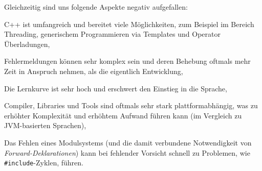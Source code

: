 Gleichzeitig sind uns folgende Aspekte negativ aufgefallen:
\begin{sitemize}{-0.3cm}
  \item C++ ist umfangreich und bereitet viele Möglichkeiten, zum Beispiel im
  Bereich Threading, generischem Programmieren via Templates und Operator
  Überladungen,
  \item Fehlermeldungen können sehr komplex sein und deren Behebung oftmals mehr
  Zeit in Anspruch nehmen, als die eigentlich Entwicklung,
  \item Die Lernkurve ist sehr hoch und erschwert den Einstieg in die Sprache,
  \item Compiler, Libraries und Tools sind oftmals sehr stark plattformabhängig,
  was zu erhöhter Komplexität und erhöhtem Aufwand führen kann (im Vergleich
  zu JVM-basierten Sprachen),
  \item Das Fehlen eines Modulsystems (und die damit verbundene Notwendigkeit
  von \emph{Forward-Deklarationen}) kann bei fehlender Vorsicht schnell zu
  Problemen, wie \texttt{\#include}-Zyklen, führen.
\end{sitemize}
